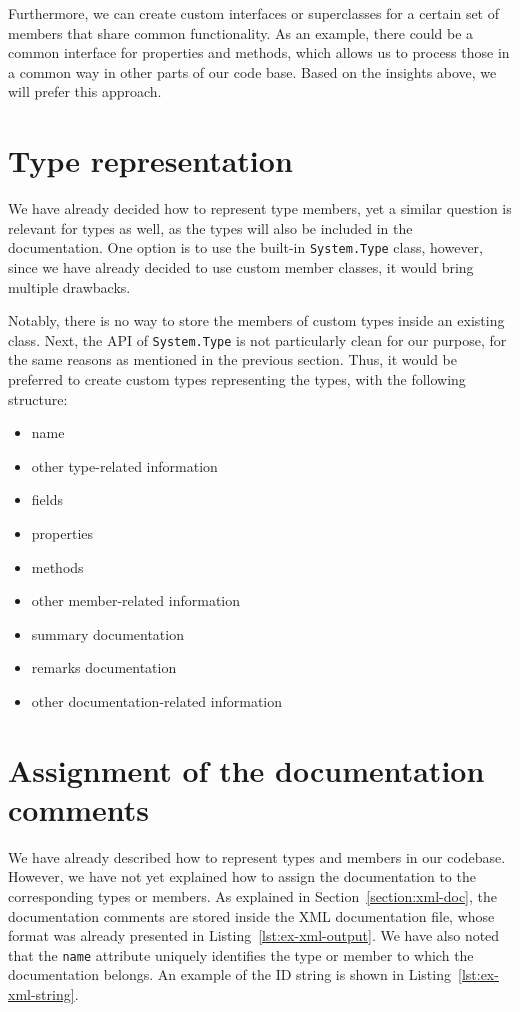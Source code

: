 Furthermore, we can create custom interfaces or superclasses for a certain set of members that share common functionality. As an example, there could be a common interface for properties and methods, which allows us
to process those in a common way in other parts of our code base.
Based on the insights above, we will prefer this approach.

\section{Type representation}
\label{sec:type-repr}

We have already decided how to represent type members, yet a similar question is relevant for types as well, as the types will also be included in the documentation.
One option is to use the built-in \texttt{System.Type} class, however, since we have already decided to use custom member classes, it would bring multiple drawbacks.

Notably, there is no way to store the members of custom types inside an existing class.
Next, the API of \texttt{System.Type} is not particularly clean for our purpose, for the same reasons as mentioned in the previous section.
Thus, it would be preferred to create custom types representing the types, with the following structure:

\begin{itemize}
    \item name
    \item other type-related information
    \item fields
    \item properties
    \item methods
    \item other member-related information
    \item summary documentation
    \item remarks documentation
    \item other documentation-related information
\end{itemize}

\section{Assignment of the documentation comments}
\label{sec:id-string}

We have already described how to represent types and members in our codebase.
However, we have not yet explained how to assign the documentation to the corresponding types or members.
As explained in Section~\ref{section:xml-doc}, the documentation comments are stored inside the XML documentation file, whose format was already presented in Listing~\ref{lst:ex-xml-output}.
We have also noted that the \texttt{name} attribute uniquely identifies the type or member to which the documentation belongs.
An example of the ID string is shown in Listing~\ref{lst:ex-xml-string}.

